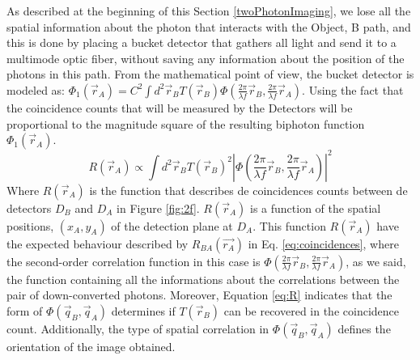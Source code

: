 As described at the beginning of this Section \ref{twoPhotonImaging}, we lose all the spatial information 
about the photon that interacts with the Object, B path, and this is done by placing a bucket detector that
gathers all light and send it to a multimode optic fiber, without saving any information about the position
of the photons in this path. From the mathematical point of view, the bucket detector is modeled
as: $\Phi_1 (\vec{r}_A) = C^2 \int d^2 \vec{r}_B T(\vec{r}_B) \Phi (\frac{2 \pi}{\lambda f}\vec{r}_B, \frac{2 \pi}{\lambda f}\vec{r}_A)$.
Using the fact that the coincidence counts that will be measured by the Detectors will be 
proportional to the magnitude square of the resulting biphoton function $\Phi_1 (\vec{r}_A)$\cite{introquantumoptics}.
\begin{equation}\label{eq:R}
R(\vec{r}_A) \propto  \int d^2 \vec{r}_B T(\vec{r}_B)^2 | \Phi (\frac{2 \pi}{\lambda f}\vec{r}_B, \frac{2 \pi}{\lambda f}\vec{r}_A) |^2
\end{equation}
Where $R(\vec{r}_A)$ is the function that describes de coincidences counts between de detectors $D_B$ and 
$D_A$ in Figure \ref{fig:2f}. $R(\vec{r}_A)$ is a function of the spatial positions, $(x_A,y_A)$
 of the detection plane at $D_A$. This function $R(\vec{r}_A)$ have the expected behaviour described
by $R_{BA}(\vec{r_A})$ in Eq. \ref{eq:coincidences}, where the second-order correlation function in this 
case is $\Phi (\frac{2 \pi}{\lambda f}\vec{r}_B, \frac{2 \pi}{\lambda f}\vec{r}_A)$, as we said, the function
containing all the informations about the correlations between the pair of down-converted photons. 
Moreover, Equation \ref{eq:R} indicates that the form of $\Phi(\vec{q}_B,\vec{q}_A)$ determines if $T(\vec{r}_B)$ can
be recovered in the coincidence count. Additionally, the type of spatial correlation in $\Phi(\vec{q}_B,\vec{q}_A)$
defines the orientation of the image obtained.

